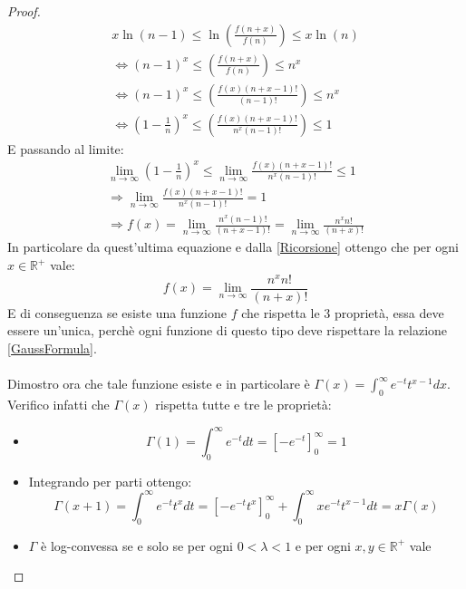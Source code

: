 \begin{proof}
\begin{gather*}
  x \ln(n-1) \le \ln \left( \frac{f(n+x)}{f(n)} \right) \le x\ln(n)\\
  \iff (n-1)^x \le \left( \frac{f(n+x)}{f(n)} \right) \le n^x \\
  \iff (n-1)^x \le \left( \frac{f(x)(n+x-1)!}{(n-1)!} \right) \le n^x \\
  \iff \left(1-\frac{1}{n}\right)^x \le \left( \frac{f(x)(n+x-1)!}{n^x(n-1)!} \right) \le 1
\end{gather*}
E passando al limite:
 \begin{gather*}
  \lim_{n\rightarrow \infty} \left(1-\frac{1}{n}\right)^x \le \lim_{n\rightarrow \infty}  \frac{f(x)(n+x-1)!}{n^x(n-1)!} \le 1 \\
  \Longrightarrow \lim_{n\rightarrow \infty} \frac{f(x)(n+x-1)!}{n^x(n-1)!}  = 1 \\
  \Longrightarrow f(x) = \lim_{n\rightarrow \infty} \frac{n^x(n-1)!}{(n+x-1)!}=\lim_{n\rightarrow \infty} \frac{n^xn!}{(n+x)!}
 \end{gather*}
In particolare da quest'ultima equazione e dalla \eqref{Ricorsione} ottengo che per ogni $x\in\mathbb{R}^+$ vale:
\begin{equation}
\label{GaussFormula}
 f(x)=\lim_{n\rightarrow \infty} \frac{n^xn!}{(n+x)!}
\end{equation}
E di conseguenza se esiste una funzione $f$ che rispetta le 3 proprietà, essa deve essere un'unica, perchè ogni
funzione di questo tipo deve rispettare la relazione \eqref{GaussFormula}.\\
\\Dimostro ora che tale funzione esiste e in particolare è 
$\Gamma(x)=\int_0^{\infty}{e^{-t}t^{x-1}dx}$. Verifico infatti che $\Gamma(x)$ rispetta tutte e tre le proprietà:
\begin{itemize}
 \item \begin{equation*}
       \Gamma(1)=\int_0^{\infty}{e^{-t}dt}=\left[-e^{-t}\right]_0^{\infty}=1
       \end{equation*}
 \item Integrando per parti ottengo:
       \begin{equation*} 
       \Gamma(x+1)=\int_0^{\infty}{e^{-t}t^xdt}=\left[-e^{-t}t^x\right]_0^{\infty}+\int_0^{\infty}xe^{-t}t^{x-1}dt=x\Gamma(x)
       \end{equation*}
 \item $\Gamma$ è log-convessa se e solo se per ogni $0<\lambda < 1$ e per ogni $x,y \in \mathbb{R}^+$ vale 

\end{itemize}
\end{proof}
